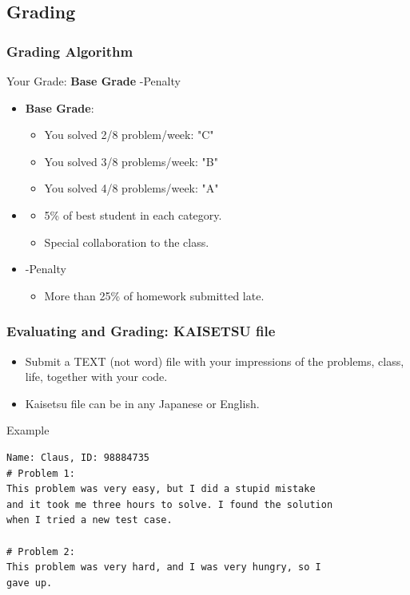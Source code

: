 \documentclass{beamer}
\begin{document}
\subsection{Grading}

\begin{frame}
  \frametitle{Grading Algorithm}

  Your Grade: {\bf Base Grade}  \alert{-Penalty}

  \begin{itemize}
    \item {\bf Base Grade}:
    \begin{itemize}
      \item You solved 2/8 problem/week: "C"
      \item You solved 3/8 problems/week: "B"
      \item You solved 4/8 problems/week: "A"
    \end{itemize}

    \bigskip

    \item {}
    \begin{itemize}
      \item 5\% of best student in each category.
      \item Special collaboration to the class.
    \end{itemize}

    \bigskip
    \item \alert{-Penalty}
    \begin{itemize}
      \item More than 25\% of homework submitted late.
    \end{itemize}
  \end{itemize}


\end{frame}

\begin{frame}[fragile]
  \frametitle{Evaluating and Grading: KAISETSU file}

  \begin{itemize}
    \item Submit a TEXT (not word) file with your impressions of the problems, class, life, together with your code.
    \item Kaisetsu file can be in any Japanese or English.
  \end{itemize}

  \bigskip

  \begin{exampleblock}{Example}
    {\smaller
\begin{verbatim}
Name: Claus, ID: 98884735
# Problem 1:
This problem was very easy, but I did a stupid mistake
and it took me three hours to solve. I found the solution
when I tried a new test case.

# Problem 2:
This problem was very hard, and I was very hungry, so I
gave up.
\end{verbatim}}
  \end{exampleblock}

\end{frame}
\end{document}
